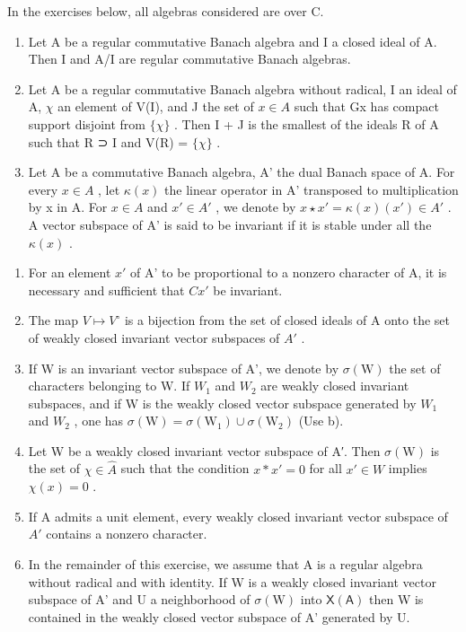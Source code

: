 
In the exercises below, all algebras considered are over C.

\begin{enumerate}
\def\labelenumi{\arabic{enumi})}
\item
  Let A be a regular commutative Banach algebra and I a closed ideal of A. Then I and A/I are regular commutative Banach algebras.
\item
  Let A be a regular commutative Banach algebra without radical, I an ideal of A, \(\chi\) an element of V(I), and J the set of \(x \in A\) such that Gx has compact support disjoint from \(\{\chi\}\) . Then I + J is the smallest of the ideals R of A such that R ⊃ I and V(R) = \(\{\chi\}\) .
\item
  Let A be a commutative Banach algebra, A' the dual Banach space of A. For every \(x \in A\) , let \(\kappa(x)\) the linear operator in A' transposed to multiplication by x in A. For \(x \in A\) and \(x' \in A'\) , we denote by \(x \star x' = \kappa(x)(x') \in A'\) . A vector subspace of A' is said to be invariant if it is stable under all the \(\kappa(x)\) .
\end{enumerate}

\begin{enumerate}
\def\labelenumi{\alph{enumi})}
\item
  For an element \(x'\) of A' to be proportional to a nonzero character of A, it is necessary and sufficient that \(Cx'\) be invariant.
\item
  The map \(V \mapsto V^{\circ}\) is a bijection from the set of closed ideals of A onto the set of weakly closed invariant vector subspaces of \(A'\) .
\item
  If W is an invariant vector subspace of A', we denote by \(\sigma(\mathrm{W})\) the set of characters belonging to W. If \(W_{1}\) and \(W_{2}\) are weakly closed invariant subspaces, and if W is the weakly closed vector subspace generated by \(W_{1}\) and \(W_{2}\) , one has \(\sigma(\mathrm{W}) = \sigma(\mathrm{W}_{1}) \cup \sigma(\mathrm{W}_{2})\) (Use b).
\item
  Let W be a weakly closed invariant vector subspace of A′. Then \(\sigma(\mathrm{W})\) is the set of \(\chi \in \widehat{A}\) such that the condition \(x * x' = 0\) for all \(x' \in W\) implies \(\chi(x) = 0\) .
\item
  If A admits a unit element, every weakly closed invariant vector subspace of \(A'\) contains a nonzero character.
\item
  In the remainder of this exercise, we assume that A is a regular algebra without radical and with identity. If W is a weakly closed invariant vector subspace of A' and U a neighborhood of \(\sigma(\mathrm{W})\) into \(\mathsf{X}(\mathsf{A})\) then W is contained in the weakly closed vector subspace of A' generated by U.
\end{enumerate}

